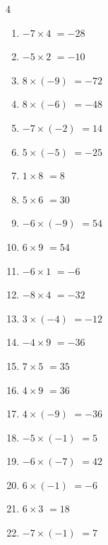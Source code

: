 \begin{multicols}{4}
\begin{enumerate}
  \item $-7\times 4$
        $=-28$

  \item $-5\times 2$
        $=-10$

  \item $8\times (-9)$
        $=-72$

  \item $8\times (-6)$
        $=-48$

  \item $-7\times (-2)$
        $=14$

  \item $5\times (-5)$
        $=-25$

  \item $1\times 8$
        $=8$

  \item $5\times 6$
        $=30$

  \item $-6\times (-9)$
        $=54$

  \item $6\times 9$
        $=54$

  \item $-6\times 1$
        $=-6$

  \item $-8\times 4$
        $=-32$

  \item $3\times (-4)$
        $=-12$

  \item $-4\times 9$
        $=-36$

  \item $7\times 5$
        $=35$

  \item $4\times 9$
        $=36$

  \item $4\times (-9)$
        $=-36$

  \item $-5\times (-1)$
        $=5$

  \item $-6\times (-7)$
        $=42$

  \item $6\times (-1)$
        $=-6$

\columnbreak %

  \item $6\times 3$
        $=18$

  \item $-7\times (-1)$
        $=7$


\end{enumerate}
\end{multicols}
